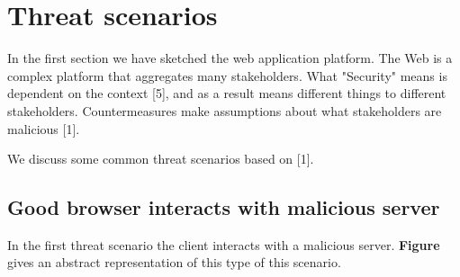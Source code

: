 \section{Threat scenarios}

In the first section we have sketched the web application platform. The Web is a complex platform that aggregates many stakeholders. What "Security" means is dependent on the context [5], and as a result means different things to different stakeholders. Countermeasures make assumptions about what stakeholders are malicious [1].

We discuss some common threat scenarios based on [1].


\subsection{Good browser interacts with malicious server}

In the first threat scenario the client interacts with a malicious server. \textbf{Figure} gives an abstract representation of this type of this scenario.


